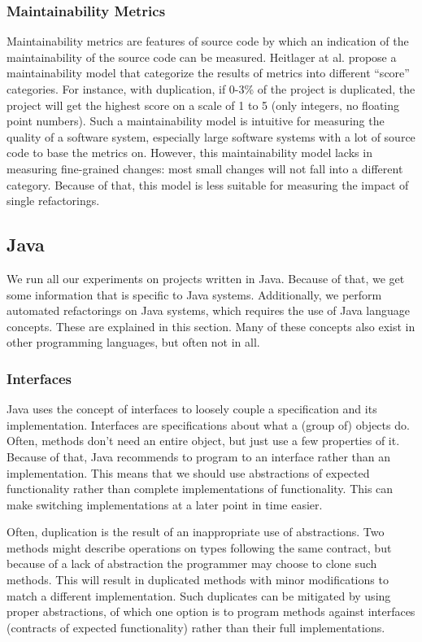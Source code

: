 \subsubsection{Maintainability Metrics}
Maintainability metrics are features of source code by which an indication of the maintainability of the source code can be measured. Heitlager at al. \cite{heitlager2007practical} propose a maintainability model that categorize the results of metrics into different ``score'' categories. For instance, with duplication, if 0-3\% of the project is duplicated, the project will get the highest score on a scale of 1 to 5 (only integers, no floating point numbers). Such a maintainability model is intuitive for measuring the quality of a software system, especially large software systems with a lot of source code to base the metrics on. However, this maintainability model \cite{heitlager2007practical} lacks in measuring fine-grained changes: most small changes will not fall into a different category. Because of that, this model is less suitable for measuring the impact of single refactorings.

\subsection{Java}
We run all our experiments on projects written in Java. Because of that, we get some information that is specific to Java systems. Additionally, we perform automated refactorings on Java systems, which requires the use of Java language concepts. These are explained in this section. Many of these concepts also exist in other programming languages, but often not in all.

\subsubsection{Interfaces}
Java uses the concept of interfaces to loosely couple a specification and its implementation. Interfaces are specifications about what a (group of) objects do. Often, methods don't need an entire object, but just use a few properties of it. Because of that, Java recommends to program to an interface rather than an implementation. This means that we should use abstractions of expected functionality rather than complete implementations of functionality. This can make switching implementations at a later point in time easier.

Often, duplication is the result of an inappropriate use of abstractions. Two methods might describe operations on types following the same contract, but because of a lack of abstraction the programmer may choose to clone such methods. This will result in duplicated methods with minor modifications to match a different implementation. Such duplicates can be mitigated by using proper abstractions, of which one option is to program methods against interfaces (contracts of expected functionality) rather than their full implementations.

